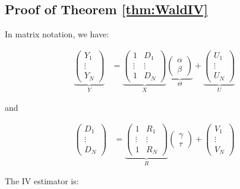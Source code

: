\documentclass[
]{book}
\theoremstyle{definition}
\theoremstyle{definition}
\theoremstyle{definition}
\theoremstyle{definition}
\theoremstyle{remark}
\begin{document}
\hypertarget{proofWaldIV}{%
\subsection{Proof of Theorem \ref{thm:WaldIV}}\label{proofWaldIV}}

In matrix notation, we have:

\begin{align*}
  \underbrace{\left(\begin{array}{c}  Y_1 \\    \vdots \\   Y_N \end{array}\right)}_{Y} & =
  \underbrace{\left(\begin{array}{cc}   1 & D_1\\   \vdots & \vdots\\   1 & D_N\end{array}\right)}_{X}
  \underbrace{\left(\begin{array}{c}    \alpha \\   \beta \end{array}\right)}_{\Theta}+
  \underbrace{\left(\begin{array}{c}    U_1 \\  \vdots \\   U_N \end{array}\right)}_{U}
\end{align*}

and

\begin{align*}
  \left(\begin{array}{c}  D_1 \\    \vdots \\   D_N \end{array}\right) & =
  \underbrace{\left(\begin{array}{cc}   1 & R_1\\   \vdots & \vdots\\   1 & R_N\end{array}\right)}_{R}
  \left(\begin{array}{c}    \gamma \\   \tau \end{array}\right)+
  \left(\begin{array}{c}    V_1 \\  \vdots \\   V_N \end{array}\right)
\end{align*}

The IV estimator is:
\end{document}
